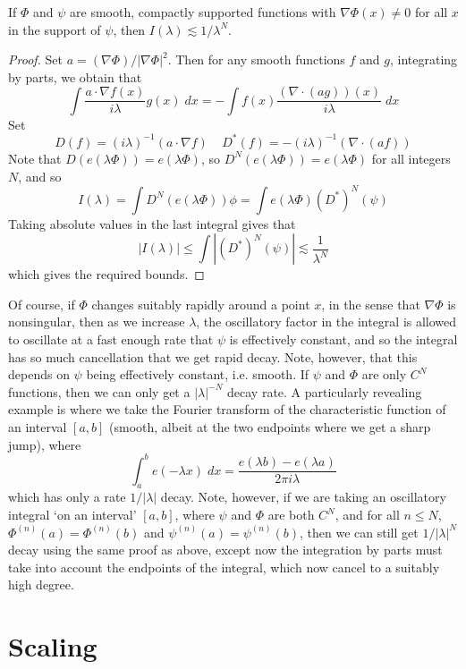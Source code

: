 \begin{theorem}
	If $\Phi$ and $\psi$ are smooth, compactly supported functions with $\nabla \Phi(x) \neq 0$ for all $x$ in the support of $\psi$, then $I(\lambda) \lesssim 1/\lambda^N$.
\end{theorem}
\begin{proof}
	Set $a = (\nabla \Phi)/|\nabla \Phi|^2$. Then for any smooth functions $f$ and $g$, integrating by parts, we obtain that
	\[ \int \frac{a \cdot \nabla f(x)}{i \lambda} g(x)\; dx = - \int f(x) \frac{(\nabla \cdot (ag))(x)}{i \lambda}\; dx \]
	Set
	\[ D(f) = (i \lambda)^{-1} (a \cdot \nabla f)\ \ \ \ \ D^*(f) = - (i\lambda)^{-1} (\nabla \cdot (af)) \]
	Note that $D(e(\lambda \Phi)) = e(\lambda \Phi)$, so $D^N(e(\lambda \Phi)) = e(\lambda \Phi)$ for all integers $N$, and so
	\[ I(\lambda) = \int D^N(e(\lambda \Phi)) \phi = \int e(\lambda \Phi) (D^*)^N(\psi) \]
	Taking absolute values in the last integral gives that
	\[ |I(\lambda)| \leq \int |(D^*)^N(\psi)| \lesssim \frac{1}{\lambda^N} \]
	which gives the required bounds.
\end{proof}

Of course, if $\Phi$ changes suitably rapidly around a point $x$, in the sense that $\nabla \Phi$ is nonsingular, then as we increase $\lambda$, the oscillatory factor in the integral is allowed to oscillate at a fast enough rate that $\psi$ is effectively constant, and so the integral has so much cancellation that we get rapid decay. Note, however, that this depends on $\psi$ being effectively constant, i.e. smooth. If $\psi$ and $\Phi$ are only $C^N$ functions, then we can only get a $|\lambda|^{-N}$ decay rate. A particularly revealing example is where we take the Fourier transform of the characteristic function of an interval $[a,b]$ (smooth, albeit at the two endpoints where we get a sharp jump), where
%
\[ \int_a^b e(- \lambda x)\; dx = \frac{e(\lambda b) - e(\lambda a)}{2 \pi i \lambda} \]
%
which has only a rate $1/|\lambda|$ decay. Note, however, if we are taking an oscillatory integral `on an interval' $[a,b]$, where $\psi$ and $\Phi$ are both $C^N$, and for all $n \leq N$, $\Phi^{(n)}(a) = \Phi^{(n)}(b)$ and $\psi^{(n)}(a) = \psi^{(n)}(b)$, then we can still get $1/|\lambda|^N$ decay using the same proof as above, except now the integration by parts must take into account the endpoints of the integral, which now cancel to a suitably high degree.

\section{Scaling}

